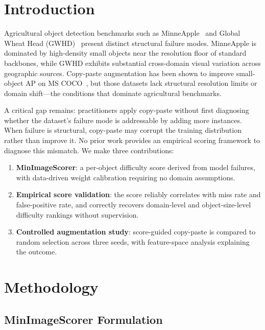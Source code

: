 \documentclass[conference]{IEEEtran}
\begin{document}
\section{Introduction}

Agricultural object detection benchmarks such as
MinneApple~\cite{hani2020minneapple} and Global Wheat Head
(GWHD)~\cite{david2021global} present distinct structural failure
modes. MinneApple is dominated by high-density small objects near the
resolution floor of standard backbones, while GWHD exhibits
substantial cross-domain visual variation across geographic sources.
Copy-paste augmentation has been shown to improve small-object AP on
MS COCO~\cite{kisantal2019augmentation,ghiasi2021simple}, but those
datasets lack structural resolution limits or domain shift---the
conditions that dominate agricultural benchmarks.

A critical gap remains: practitioners apply copy-paste without first
diagnosing whether the dataset's failure mode is addressable by adding
more instances. When failure is structural, copy-paste may corrupt the
training distribution rather than improve it. No prior work provides
an empirical scoring framework to diagnose this mismatch. We make
three contributions:
\begin{enumerate}
    \item \textbf{MinImageScorer}: a per-object difficulty score
    derived from model failures, with data-driven weight calibration
    requiring no domain assumptions.
    \item \textbf{Empirical score validation}: the score reliably
    correlates with miss rate and false-positive rate, and correctly
    recovers domain-level and object-size-level difficulty rankings
    without supervision.
    \item \textbf{Controlled augmentation study}: score-guided
    copy-paste is compared to random selection across three seeds,
    with feature-space analysis explaining the outcome.
\end{enumerate}

\section{Methodology}

\subsection{MinImageScorer Formulation}
\end{document}
